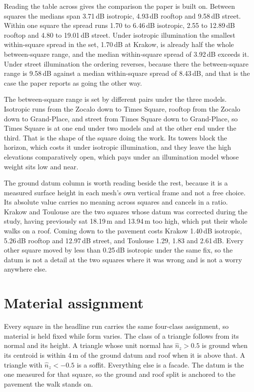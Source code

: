 \documentclass[journal]{IEEEtran}
\begin{document}
Reading the table across gives the comparison the paper is built on. Between
squares the medians span 3.71\,dB isotropic, 4.93\,dB rooftop and 9.58\,dB
street. Within one square the spread runs 1.70 to 6.46\,dB isotropic, 2.55 to
12.89\,dB rooftop and 4.80 to 19.01\,dB street. Under isotropic illumination the
smallest within-square spread in the set, 1.70\,dB at Krakow, is already half
the whole between-square range, and the median within-square spread of 3.92\,dB
exceeds it. Under street illumination the ordering reverses, because there the
between-square range is 9.58\,dB against a median within-square spread of
8.43\,dB, and that is the case the paper reports as going the other way.

The between-square range is set by different pairs under the three models.
Isotropic runs from the Zocalo down to Times Square, rooftop from the Zocalo
down to Grand-Place, and street from Times Square down to Grand-Place, so Times
Square is at one end under two models and at the other end under the third. That
is the shape of the square doing the work. Its towers block the horizon, which
costs it under isotropic illumination, and they leave the high elevations
comparatively open, which pays under an illumination model whose weight sits low
and near.

The ground datum column is worth reading beside the rest, because it is a
measured surface height in each mesh's own vertical frame and not a free choice.
Its absolute value carries no meaning across squares and cancels in a ratio.
Krakow and Toulouse are the two squares whose datum was corrected during the
study, having previously sat 18.19\,m and 13.94\,m too high, which put their
whole walks on a roof. Coming down to the pavement costs Krakow 1.40\,dB
isotropic, 5.26\,dB rooftop and 12.97\,dB street, and Toulouse 1.29, 1.83 and
2.61\,dB. Every other square moved by less than 0.25\,dB isotropic under the
same fix, so the datum is not a detail at the two squares where it was wrong and
is not a worry anywhere else.

\section{Material assignment}
\label{sec:si-materials}

Every square in the headline run carries the same four-class assignment, so
material is held fixed while form varies. The class of a triangle follows from
its normal and its height. A triangle whose unit normal has $\hat{n}_z > 0.5$ is
ground when its centroid is within 4\,m of the ground datum and roof when it is
above that. A triangle with $\hat{n}_z < -0.5$ is a soffit. Everything else is a
facade. The datum is the one measured for that square, so the ground and roof
split is anchored to the pavement the walk stands on.
\end{document}
